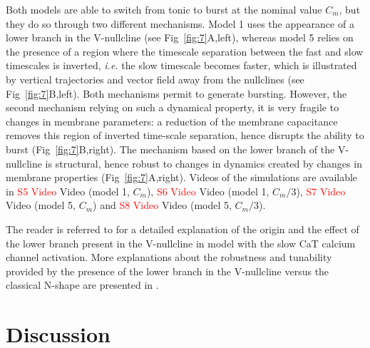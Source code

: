 Both models are able to switch from tonic to burst at the nominal value $C_m$, but they do so through two different mechanisms. Model 1 uses the appearance of a lower branch in the V-nullcline (see Fig~\ref{fig:7}A,left), whereas model 5 relies on the presence of a region where the timescale separation between the fast and slow timescales is inverted, \textit{i.e. } the slow timescale becomes faster, which is illustrated by vertical trajectories and vector field away from the nullclines (see Fig~\ref{fig:7}B,left). Both mechanisms permit to generate bursting. However, the second mechanism relying on such a dynamical property, it is very fragile to changes in membrane parameters: a reduction of the membrane capacitance removes this region of inverted time-scale separation, hence disrupts the ability to burst (Fig~\ref{fig:7}B,right). The mechanism based on the lower branch of the V-nullcline is structural, hence robust to changes in dynamics created by changes in membrane properties (Fig~\ref{fig:7}A,right).  Videos of the simulations are available in \textcolor{red}{S5 Video} Video (model 1, $C_m$), \textcolor{red}{S6 Video} Video (model 1, $C_m/3$), \textcolor{red}{S7 Video} Video (model 5, $C_m$) and \textcolor{red}{S8 Video} Video (model 5, $C_m/3$).

The reader is referred to \citep{drion_novel_2012, franci_organizing_2012,franci_balance_2013}  for a detailed explanation of the origin and the effect of the lower branch present in the V-nullcline in model with the slow CaT calcium channel activation.  More explanations about the robustness and tunability provided by the presence of the lower branch in the V-nullcline versus the classical N-shape are presented in \citep{franci_robust_2018}.



\section{Discussion}
